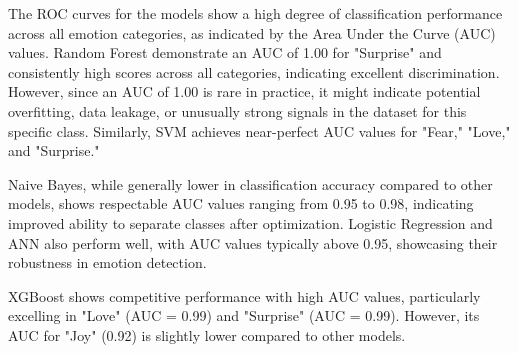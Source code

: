 The ROC curves for the models show a high degree of classification performance across all emotion categories, as indicated by the Area Under the Curve (AUC) values. Random Forest demonstrate an AUC of 1.00 for "Surprise" and consistently high scores across all categories, indicating excellent discrimination. However, since an AUC of 1.00 is rare in practice, it might indicate potential overfitting, data leakage, or unusually strong signals in the dataset for this specific class. Similarly, SVM achieves near-perfect AUC values for "Fear," "Love," and "Surprise."

Naive Bayes, while generally lower in classification accuracy compared to other models, shows respectable AUC values ranging from 0.95 to 0.98, indicating improved ability to separate classes after optimization. Logistic Regression and ANN also perform well, with AUC values typically above 0.95, showcasing their robustness in emotion detection.

XGBoost shows competitive performance with high AUC values, particularly excelling in "Love" (AUC = 0.99) and "Surprise" (AUC = 0.99). However, its AUC for "Joy" (0.92) is slightly lower compared to other models.


\clearpage
